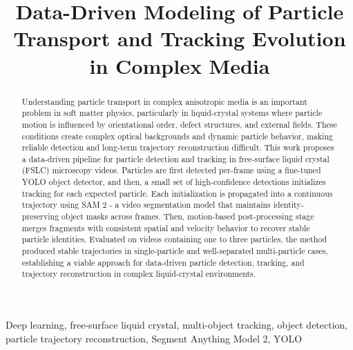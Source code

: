 \documentclass[conference]{IEEEtran}
\begin{document}
\title{Data-Driven Modeling of Particle Transport and Tracking Evolution in Complex Media\\
{\footnotesize \textsuperscript{}
}}

\author{
\and
{}
}


\maketitle

\begin{abstract}
Understanding particle transport in complex anisotropic media is an important problem in soft matter physics, particularly in liquid-crystal systems where particle motion is influenced by orientational order, defect structures, and external fields. These conditions create complex optical backgrounds and dynamic particle behavior, making reliable detection and long-term trajectory reconstruction difficult. This work proposes a data-driven pipeline for particle detection and tracking in free-surface liquid crystal (FSLC) microscopy videos. Particles are first detected per-frame using a fine-tuned YOLO object detector, and then, a small set of high-confidence detections initializes tracking for each expected particle. Each initialization is propagated into a continuous trajectory using SAM 2 - a video segmentation model that maintains identity-preserving object masks across frames. Then, motion-based post-processing stage merges fragments with consistent spatial and velocity behavior to recover stable particle identities. Evaluated on videos containing one to three particles, the method produced stable trajectories in single-particle and well-separated multi-particle cases, establishing a viable approach for data-driven particle detection, tracking, and trajectory reconstruction in complex liquid-crystal environments. 
\end{abstract}

\begin{IEEEkeywords}
Deep learning, free-surface liquid crystal, multi-object tracking, object detection, particle trajectory reconstruction, Segment Anything Model 2, YOLO
\end{IEEEkeywords}
\end{document}
